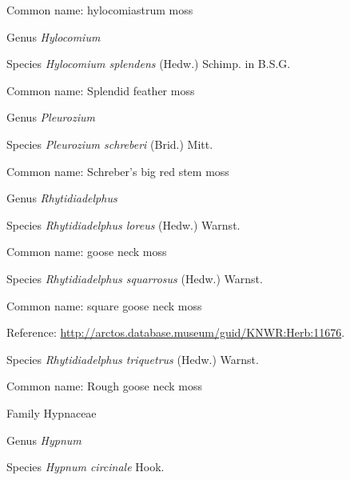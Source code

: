 \documentclass[9pt, article]{memoir}
\begin{document}
\begin{multicols}{2}
Common name: hylocomiastrum moss

\vspace{6pt}\noindent\hspace{30pt}Genus \textit{Hylocomium}


\vspace{6pt}\noindent\hspace{36pt}Species \textit{Hylocomium splendens} (Hedw.) Schimp. in B.S.G.


Common name: Splendid feather moss

\vspace{6pt}\noindent\hspace{30pt}Genus \textit{Pleurozium}


\vspace{6pt}\noindent\hspace{36pt}Species \textit{Pleurozium schreberi} (Brid.) Mitt.


Common name: Schreber's big red stem moss

\vspace{6pt}\noindent\hspace{30pt}Genus \textit{Rhytidiadelphus}


\vspace{6pt}\noindent\hspace{36pt}Species \textit{Rhytidiadelphus loreus} (Hedw.) Warnst.


Common name: goose neck moss

\vspace{6pt}\noindent\hspace{36pt}Species \textit{Rhytidiadelphus squarrosus} (Hedw.) Warnst.


Common name: square goose neck moss

Reference: 
\url{http://arctos.database.museum/guid/KNWR:Herb:11676}.

\vspace{6pt}\noindent\hspace{36pt}Species \textit{Rhytidiadelphus triquetrus} (Hedw.) Warnst.


Common name: Rough goose neck moss

\vspace{6pt}\noindent\hspace{24pt}Family Hypnaceae


\vspace{6pt}\noindent\hspace{30pt}Genus \textit{Hypnum}


\vspace{6pt}\noindent\hspace{36pt}Species \textit{Hypnum circinale} Hook.



\end{multicols}
\end{document}
